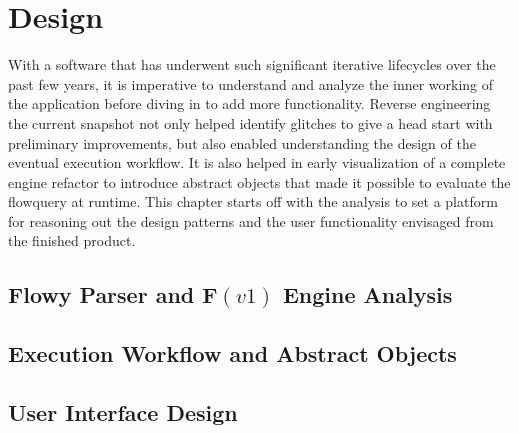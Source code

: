 \chapter{Design}\label{ch:design}

With a software that has underwent such significant iterative lifecycles over
the past few years, it is imperative to understand and analyze the inner
working of the application before diving in to add more functionality. Reverse
engineering the current snapshot not only helped identify glitches to give a
head start with preliminary improvements, but also enabled understanding the
design of the eventual execution workflow. It is also helped in early
visualization of a complete engine refactor to introduce abstract objects that
made it possible to evaluate the flowquery at runtime. This chapter starts off
with the analysis to set a platform for reasoning out the design patterns and
the user functionality envisaged from the finished product.

\section{Flowy Parser and F$(v1)$ Engine Analysis}\label{sec:adt-workflow}


\section{Execution Workflow and Abstract Objects}\label{sec:adt-workflow}


\section{User Interface Design}\label{sec:engine-interface}

